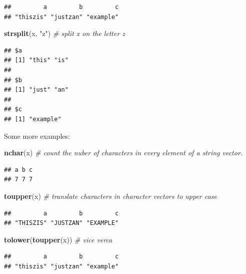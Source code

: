 \documentclass[]{book}
\newenvironment{Shaded}{\begin{snugshade}}{\end{snugshade}}
\newcommand{\KeywordTok}[1]{\textcolor[rgb]{0.13,0.29,0.53}{\textbf{#1}}}
\newcommand{\StringTok}[1]{\textcolor[rgb]{0.31,0.60,0.02}{#1}}
\newcommand{\CommentTok}[1]{\textcolor[rgb]{0.56,0.35,0.01}{\textit{#1}}}
\newcommand{\NormalTok}[1]{#1}
\theoremstyle{definition}
\theoremstyle{definition}
\theoremstyle{definition}
\theoremstyle{remark}
\begin{document}
\begin{verbatim}
##         a         b         c 
## "thiszis" "justzan" "example"
\end{verbatim}

\begin{Shaded}
\begin{Highlighting}[]
\KeywordTok{strsplit}\NormalTok{(x, }\StringTok{"z"}\NormalTok{) }\CommentTok{# split x on the letter z}
\end{Highlighting}
\end{Shaded}

\begin{verbatim}
## $a
## [1] "this" "is"  
## 
## $b
## [1] "just" "an"  
## 
## $c
## [1] "example"
\end{verbatim}

Some more examples:

\begin{Shaded}
\begin{Highlighting}[]
\KeywordTok{nchar}\NormalTok{(x) }\CommentTok{#  count the nuber of characters in every element of a string vector.}
\end{Highlighting}
\end{Shaded}

\begin{verbatim}
## a b c 
## 7 7 7
\end{verbatim}

\begin{Shaded}
\begin{Highlighting}[]
\KeywordTok{toupper}\NormalTok{(x) }\CommentTok{# translate characters in character vectors to upper case}
\end{Highlighting}
\end{Shaded}

\begin{verbatim}
##         a         b         c 
## "THISZIS" "JUSTZAN" "EXAMPLE"
\end{verbatim}

\begin{Shaded}
\begin{Highlighting}[]
\KeywordTok{tolower}\NormalTok{(}\KeywordTok{toupper}\NormalTok{(x)) }\CommentTok{# vice verca}
\end{Highlighting}
\end{Shaded}

\begin{verbatim}
##         a         b         c 
## "thiszis" "justzan" "example"
\end{verbatim}
\end{document}
